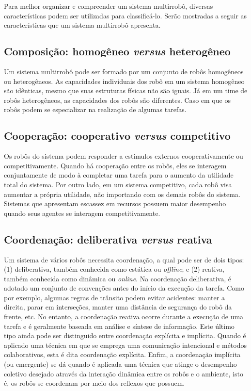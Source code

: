         Para melhor organizar e compreender um sistema multirrobô, diversas características podem ser utilizadas para classificá-lo. Serão mostradas a seguir as características que um sistema multirrobô apresenta.
        
        \subsection{Composição: homogêneo \textit{versus} heterogêneo}
            Um sistema multirrobô pode ser formado por um conjunto de robôs homogêneos ou heterogêneos. As capacidades individuais dos robô em um sistema homogêneo são idênticas, mesmo que suas estruturas físicas não são iguais. Já em um time de robôs heterogêneos, as capacidades dos robôs são diferentes. Caso em que os robôs podem se especializar na realização de algumas tarefas. %
        
        \subsection{Cooperação: cooperativo \textit{versus} competitivo}
            Os robôs do sistema podem responder a estímulos externos cooperativamente ou competitivamente. Quando há cooperação entre os robôs, eles se interagem conjuntamente de modo à completar uma tarefa para o aumento da utilidade total do sistema. Por outro lado, em um sistema competitivo, cada robô visa aumentar a própria utilidade, não importando com os demais robôs do sistema. Sistemas que apresentam escassez em recursos possuem maior desempenho quando seus agentes se interagem competitivamente.
        
        \subsection{Coordenação: deliberativa \textit{versus} reativa}
            Um sistema de vários robôs necessita coordenação, a qual pode ser de dois tipos: (1) deliberativa, também conhecida como estática ou \textit{offline}; e (2) reativa, também conhecida como dinâmica ou \textit{online}. Na coordenação deliberativa, é adotado um conjunto de convenções antes do início da execução da tarefa. Como por exemplo, algumas regras de trânsito podem evitar acidentes: manter a direita, parar em interseções, manter uma distância de segurança do robô da frente, etc. No entanto, a coordenação reativa ocorre durante a execução de uma tarefa e é geralmente baseada em análise e síntese de informação. Este último tipo ainda pode ser distinguido entre coordenação explícita e implícita. Quando é aplicado uma técnica em que se emprega uma comunicação intencional e métodos colaborativos, esta é dita coordenação explícita. Enfim, a coordenação implícita (ou emergente) se dá quando é aplicada uma técnica que atinge o desempenho coletivo desejado através da interação dinâmica entre os robôs e o ambiente, isto é, os robôs se coordenam por meio dos reflexos que possuem.
        
